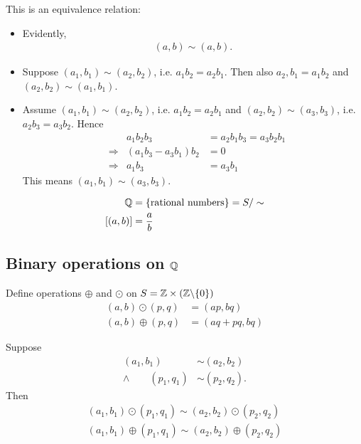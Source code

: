 This is an equivalence relation:
\begin{itemize}
	\item Evidently,
	\begin{align*}
	(a, b) \sim (a, b).
	\end{align*}
	\item
	Suppose $(a_1,b_1) \sim (a_2, b_2)$, i.e. $a_1 b_2 = a_2 b_1$. Then also $a_2, b_1 = a_1 b_2$ and $(a_2, b_2) \sim (a_1, b_1)$.
	\item
	Assume $(a_1, b_1) \sim (a_2, b_2)$, i.e. $a_1 b_2 = a_2 b_1$ and $(a_2, b_2) \sim (a_3, b_3)$, i.e. $a_2 b_3 = a_3 b_2$. Hence
	\begin{align*}
	& & a_1 b_2 b_3 & = a_2 b_1 b_3 = a_3 b_2 b_1 \\
	& \Rightarrow & (a_1b_3 - a_3 b_1) b_2 & = 0 \\
	& \Rightarrow & a_1 b_3 & = a_3 b_1
	\end{align*}  
	This means $(a_1, b_1) \sim (a_3, b_3)$.
\end{itemize}

\begin{df}
	\begin{align*} 
	\mathbb Q & = \{ \text{rational numbers} \} = S/ \sim  \\
	[(a,b)] & = \frac a b 
	\end{align*}
\end{df}

\subsection{Binary operations on $\mathbb Q$} 
Define operations $\oplus$ and $\odot$ on $S = \mathbb Z \times (\mathbb Z \backslash \{0\})$
\begin{align*}
(a,b) \odot (p,q) & = (ap, bq) \\
(a,b) \oplus (p,q) & = (aq + pq, bq) 
\end{align*}


\begin{pp}
	Suppose
	\begin{align*}
	(a_1, b_1) & \sim (a_2, b_2) \\
	\wedge \qquad (p_1, q_1) & \sim (p_2, q_2).
	\end{align*}
	Then
	\begin{align*}
	(a_1, b_1) \odot (p_1, q_1) \sim (a_2, b_2) \odot (p_2, q_2) \tag{1} \\
	(a_1, b_1) \oplus (p_1, q_1) \sim (a_2, b_2) \oplus (p_2, q_2) \tag{2}
	\end{align*}
\end{pp}

